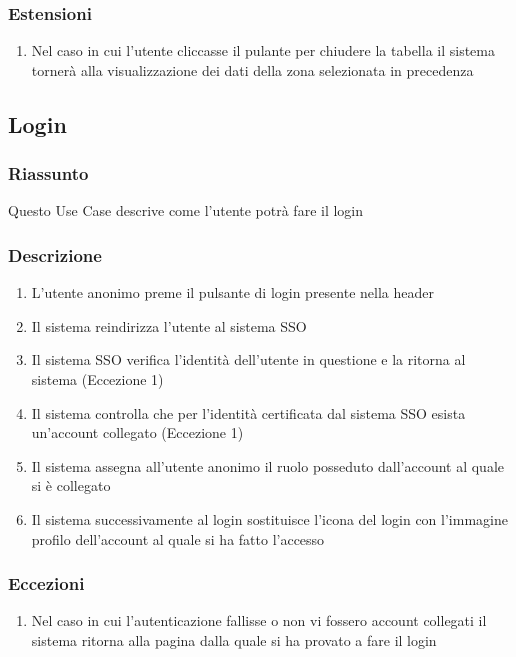         \subsubsection{Estensioni}
            \begin{enumerate}
                \item Nel caso in cui l'utente cliccasse il pulante per chiudere la tabella il sistema tornerà alla visualizzazione dei dati della zona selezionata in precedenza
            \end{enumerate}

    \subsection{Login}
        \subsubsection{Riassunto}
            Questo Use Case descrive come l'utente potrà fare il login
        \subsubsection{Descrizione}
            \begin{enumerate}
                \item L'utente anonimo preme il pulsante di login presente nella header
                \item Il sistema reindirizza l'utente al sistema SSO
                \item Il sistema SSO verifica l'identità dell'utente in questione e la ritorna al sistema (Eccezione 1)
                \item Il sistema controlla che per l'identità certificata dal sistema SSO esista un'account collegato (Eccezione 1)
                \item Il sistema assegna all'utente anonimo il ruolo posseduto dall'account al quale si è collegato
                \item Il sistema successivamente al login sostituisce l'icona del login con l'immagine profilo dell'account al quale si ha fatto l'accesso
            \end{enumerate}
        \subsubsection{Eccezioni}
            \begin{enumerate}
                \item Nel caso in cui l'autenticazione fallisse o non vi fossero account collegati il sistema ritorna alla pagina dalla quale si ha provato a fare il login
            \end{enumerate}


